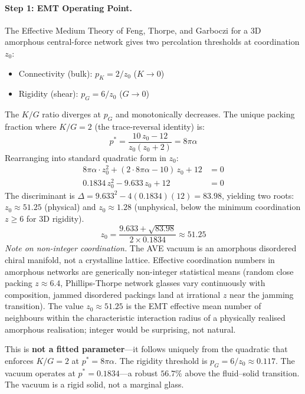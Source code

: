 \paragraph{Step 1: EMT Operating Point.}
The Effective Medium Theory of Feng, Thorpe, and Garboczi for a 3D amorphous
central-force network gives two percolation thresholds at coordination $z_0$:
\begin{itemize}
    \item Connectivity (bulk): $p_K = 2/z_0$ \quad ($K \to 0$)
    \item Rigidity (shear): $p_G = 6/z_0$ \quad ($G \to 0$)
\end{itemize}
The $K/G$ ratio diverges at $p_G$ and monotonically decreases. The unique
packing fraction where $K/G = 2$ (the trace-reversal identity) is:
\begin{equation}
    p^* = \frac{10\,z_0 - 12}{z_0(z_0 + 2)} = 8\pi\alpha
    \label{eq:EMT_operating_point}
\end{equation}
Rearranging into standard quadratic form in $z_0$:
\begin{align}
    8\pi\alpha \cdot z_0^2 + (2\cdot 8\pi\alpha - 10)\,z_0 + 12 &= 0 \nonumber\\
    0.1834\,z_0^2 - 9.633\,z_0 + 12 &= 0
\end{align}
The discriminant is $\Delta = 9.633^2 - 4(0.1834)(12) = 83.98$, yielding two
roots: $z_0 \approx 51.25$ (physical) and $z_0 \approx 1.28$ (unphysical,
below the minimum coordination $z \ge 6$ for 3D rigidity).
\begin{equation}
    z_0 = \frac{9.633 + \sqrt{83.98}}{2 \times 0.1834}
    \approx \boxed{51.25}
    \label{eq:z0}
\end{equation}
\textit{Note on non-integer coordination.} The AVE vacuum is an amorphous disordered chiral manifold, not a crystalline lattice. Effective coordination numbers in amorphous networks are generically non-integer statistical means (random close packing $z \approx 6.4$, Phillips-Thorpe network glasses vary continuously with composition, jammed disordered packings land at irrational $z$ near the jamming transition). The value $z_0 \approx 51.25$ is the EMT effective mean number of neighbours within the characteristic interaction radius of a physically realised amorphous realisation; integer would be surprising, not natural.

This is \textbf{not a fitted parameter}---it follows uniquely from the
quadratic that enforces $K/G = 2$ at $p^* = 8\pi\alpha$.
The rigidity threshold is $p_G = 6/z_0 \approx 0.117$. The vacuum operates at
$p^* = 0.1834$---a robust $56.7\%$ above the fluid--solid transition. The
vacuum is a rigid solid, not a marginal glass.

